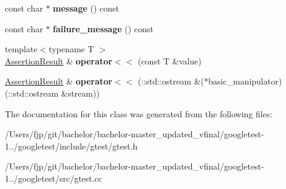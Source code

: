 \begin{DoxyCompactItemize}
\mbox{\label{classtesting_1_1_assertion_result_a33c14dafd28e3393c841e03f4b70a017}} 
const char $\ast$ {\bfseries message} () const
\item 
\mbox{\label{classtesting_1_1_assertion_result_aa38908d5a48c912434a80c8725f52583}} 
const char $\ast$ {\bfseries failure\+\_\+message} () const
\item 
\mbox{\label{classtesting_1_1_assertion_result_a3230efa81aafe7c61f5fb878cfa39e91}} 
{\footnotesize template$<$typename T $>$ }\\\mbox{\hyperlink{classtesting_1_1_assertion_result}{Assertion\+Result}} \& {\bfseries operator$<$$<$} (const T \&value)
\item 
\mbox{\label{classtesting_1_1_assertion_result_a43ae8a260843ce2ff3dc9af262672b8b}} 
\mbox{\hyperlink{classtesting_1_1_assertion_result}{Assertion\+Result}} \& {\bfseries operator$<$$<$} (\+::std\+::ostream \&($\ast$basic\+\_\+manipulator)(\+::std\+::ostream \&stream))
\end{DoxyCompactItemize}


The documentation for this class was generated from the following files\+:\begin{DoxyCompactItemize}
\item 
/\+Users/fjp/git/bachelor/bachelor-\/master\+\_\+updated\+\_\+vfinal/googletest-\/1../googletest/include/gtest/gtest.\+h\item 
/\+Users/fjp/git/bachelor/bachelor-\/master\+\_\+updated\+\_\+vfinal/googletest-\/1../googletest/src/gtest.\+cc\end{DoxyCompactItemize}
